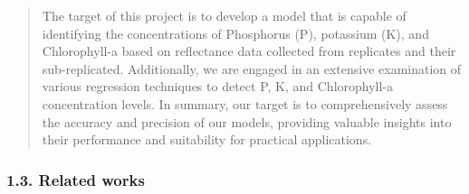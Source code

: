 \documentclass[
]{article}
\begin{document}
\begin{quote}
The target of this project is to develop a model that is capable of
identifying the concentrations of Phosphorus (P), potassium (K), and
Chlorophyll-a based on reflectance data collected from replicates and
their sub-replicated. Additionally, we are engaged in an extensive
examination of various regression techniques to detect P, K, and
Chlorophyll-a concentration levels. In summary, our target is to
comprehensively assess the accuracy and precision of our models,
providing valuable insights into their performance and suitability for
practical applications.
\end{quote}

\hypertarget{related-works}{%
\subsubsection{\texorpdfstring{ \textbf{1.3. Related
works}}{ 1.3. Related works}}\label{related-works}}
\end{document}
